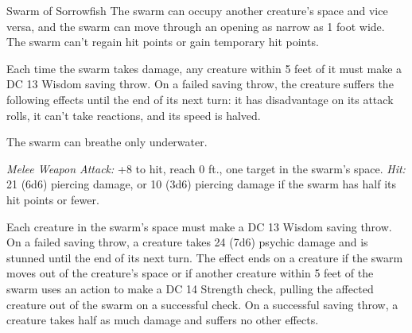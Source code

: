\documentclass[10pt,a4paper,twoside,fancy,bg=print,twocolumn,openany,nodeprecatedcode]{dndbook}
\begin{document}
\begin{DndMonster}[float=t]{Swarm of Sorrowfish}
\DndMonsterBasics[
armor-class = {14},
hit-points = {\DndDice{16d8 + 32}},
speed = {0 ft., swim 30 ft.}
]
\DndMonsterAbilityScores[
 str = 16,
 dex = 19,
 con = 14,
 int = 1,
 wis = 11,
 cha = 3
]
\DndMonsterDetails[
damage-resistances = {bludgeoning, piercing, slashing},
damage-immunities = {psychic},
senses = {blindsight 60 ft. (blind beyond this radius), passive perception 10},
challenge = 6,
]
The swarm can occupy another creature's space and vice versa, and the swarm can move through an opening as narrow as 1 foot wide. The swarm can't regain hit points or gain temporary hit points.

Each time the swarm takes damage, any creature within 5 feet of it must make a DC 13 Wisdom saving throw. On a failed saving throw, the creature suffers the following effects until the end of its next turn: it has disadvantage on its attack rolls, it can't take reactions, and its speed is halved.

The swarm can breathe only underwater.

\textsl{Melee Weapon Attack:} +8 to hit, reach 0 ft., one target in the swarm's space. \textsl{Hit:} 21 (6d6) piercing damage, or 10 (3d6) piercing damage if the swarm has half its hit points or fewer.

Each creature in the swarm's space must make a DC 13 Wisdom saving throw. On a failed saving throw, a creature takes 24 (7d6) psychic damage and is stunned until the end of its next turn. The effect ends on a creature if the swarm moves out of the creature's space or if another creature within 5 feet of the swarm uses an action to make a DC 14 Strength check, pulling the affected creature out of the swarm on a successful check. On a successful saving throw, a creature takes half as much damage and suffers no other effects.

\end{DndMonster}
\end{document}
